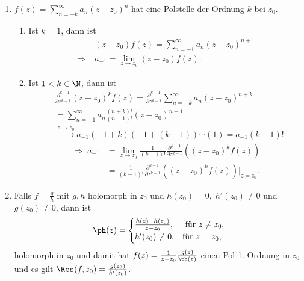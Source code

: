 \begin{prop}[Residuenberechnung]
\label{prop:2.92}
\begin{enumerate}[label=\arabic{*}.)]
  \item $f(z) = \sum\limits_{n=-k}^\infty a_n (z-z_0)^n$ hat eine Polstelle der
  Ordnung $k$ bei $z_0$.
\begin{enumerate}[label=(\alph{*})]
  \item Ist $k=1$, dann ist
  \begin{align*}
  &(z-z_0)f(z) = \sum\limits_{n=-1}^\infty a_n(z-z_0)^{n+1}\\
  \Rightarrow\; &a_{-1}  = \lim\limits_{z\to z_0} (z-z_0)f(z).
  \end{align*}
  \item Ist $1<k\in\N$, dann ist
  \begin{align*}
  &\frac{\partial^{k-1}}{\partial z^{k-1}} (z-z_0)^k f(z)
  = \frac{\partial^{k-1}}{\partial z^{k-1}} \sum\limits_{n=-k}^\infty a_n
  (z-z_0)^{n+k}
  \\ &= \sum\limits_{n=-1}^\infty a_n \frac{(n+k)!}{(n+1)!} (z-z_0)^{n+1}\\
  &\overset{z\to z_0}{\rightarrow} a_{-1} (-1+k)(-1+(k-1))\cdots(1) =
  a_{-1}(k-1)!
  \end{align*}
\begin{align*}
  \Rightarrow\; a_{-1} &= \lim\limits_{z\to z_0}
  \frac{1}{(k-1)!}\frac{\partial^{k-1}}{\partial z^{k-1}} \left((z-z_0)^k
 f(z) \right) \\ &= \frac{1}{(k-1)!}\frac{\partial^{k-1}}{\partial z^{k-1}}
 \left( (z-z_0)^k f(z) \right)\big|_{z=z_0}.
  \end{align*}
\end{enumerate}
\item Falls $f=\frac{g}{h}$ mit $g,h$ holomorph in $z_0$ und $h(z_0) = 0,\;
h'(z_0)\neq 0$ und $g(z_0)\neq 0$, dann ist
\begin{align*}
\ph(z) = \begin{cases}
         \frac{h(z)-h(z_0)}{z-z_0}, & \text{ für } z\neq z_0,\\
         h'(z_0)\neq 0,&\text{für } z=z_0,
         \end{cases}
\end{align*}
holomorph in $z_0$ und damit hat $f(z) = \frac{1}{z-z_0}\frac{g(z)}{\ph(z)}$
einen Pol 1. Ordnung in $z_0$ und es gilt $\Res (f,z_0) =
\frac{g(z_0)}{h'(z_0)}$.
\end{enumerate}
\end{prop} 

